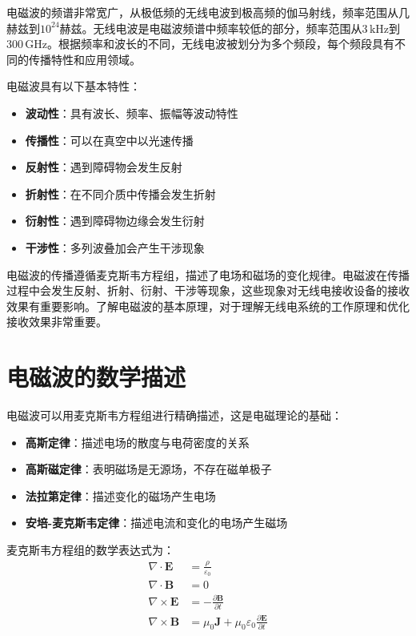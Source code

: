 \documentclass[12pt,UTF8]{ctexbook}
\begin{document}
电磁波的频谱非常宽广，从极低频的无线电波到极高频的伽马射线，频率范围从几赫兹到$10^{24}$赫兹。无线电波是电磁波频谱中频率较低的部分，频率范围从$3\,\text{kHz}$到$300\,\text{GHz}$。根据频率和波长的不同，无线电波被划分为多个频段，每个频段具有不同的传播特性和应用领域。

电磁波具有以下基本特性：

\begin{itemize}[leftmargin=3.5em]
    \item \textbf{波动性}：具有波长、频率、振幅等波动特性
    \item \textbf{传播性}：可以在真空中以光速传播
    \item \textbf{反射性}：遇到障碍物会发生反射
    \item \textbf{折射性}：在不同介质中传播会发生折射
    \item \textbf{衍射性}：遇到障碍物边缘会发生衍射
    \item \textbf{干涉性}：多列波叠加会产生干涉现象
\end{itemize}

电磁波的传播遵循麦克斯韦方程组，描述了电场和磁场的变化规律。电磁波在传播过程中会发生反射、折射、衍射、干涉等现象，这些现象对无线电接收设备的接收效果有重要影响。了解电磁波的基本原理，对于理解无线电系统的工作原理和优化接收效果非常重要。

\section{电磁波的数学描述}

电磁波可以用麦克斯韦方程组进行精确描述，这是电磁理论的基础：

\begin{itemize}[leftmargin=3.5em]
    \item \textbf{高斯定律}：描述电场的散度与电荷密度的关系
    \item \textbf{高斯磁定律}：表明磁场是无源场，不存在磁单极子
    \item \textbf{法拉第定律}：描述变化的磁场产生电场
    \item \textbf{安培-麦克斯韦定律}：描述电流和变化的电场产生磁场
\end{itemize}

麦克斯韦方程组的数学表达式为：
\begin{align}
\nabla \cdot \mathbf{E} &= \frac{\rho}{\varepsilon_0} \\
\nabla \cdot \mathbf{B} &= 0 \\
\nabla \times \mathbf{E} &= -\frac{\partial \mathbf{B}}{\partial t} \\
\nabla \times \mathbf{B} &= \mu_0\mathbf{J} + \mu_0\varepsilon_0\frac{\partial \mathbf{E}}{\partial t} \\ 
\end{align}
\end{document}

